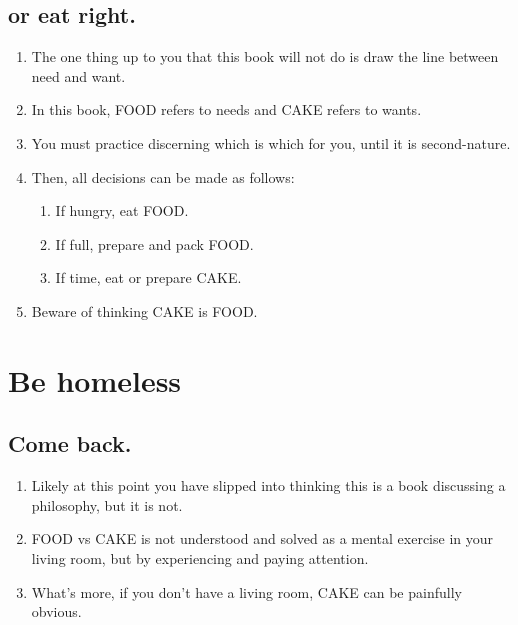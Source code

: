 \documentclass[
]{book}
\providecommand{\tightlist}{%
  \setlength{\itemsep}{0pt}\setlength{\parskip}{0pt}}
\begin{document}
\hypertarget{or-eat-right.}{%
\subsection{or eat right.}\label{or-eat-right.}}

\begin{enumerate}
\def\labelenumi{\arabic{enumi}.}
\setcounter{enumi}{22}
\tightlist
\item
  The one thing up to you that this book will not do is draw the line between need and want.
\item
  In this book, FOOD refers to needs and CAKE refers to wants.
\item
  You must practice discerning which is which for you, until it is second-nature.
\item
  Then, all decisions can be made as follows:

  \begin{enumerate}
  \def\labelenumii{\arabic{enumii}.}
  \tightlist
  \item
    If hungry, eat FOOD.
  \item
    If full, prepare and pack FOOD.
  \item
    If time, eat or prepare CAKE.
  \end{enumerate}
\item
  Beware of thinking CAKE is FOOD.
\end{enumerate}

\hypertarget{be-homeless}{%
\section{Be homeless}\label{be-homeless}}

\hypertarget{come-back.}{%
\subsection{Come back.}\label{come-back.}}

\begin{enumerate}
\def\labelenumi{\arabic{enumi}.}
\setcounter{enumi}{25}
\tightlist
\item
  Likely at this point you have slipped into thinking this is a book discussing a philosophy, but it is not.
\item
  FOOD vs CAKE is not understood and solved as a mental exercise in your living room, but by experiencing and paying attention.
\item
  What's more, if you don't have a living room, CAKE can be painfully obvious.
\end{enumerate}
\end{document}
